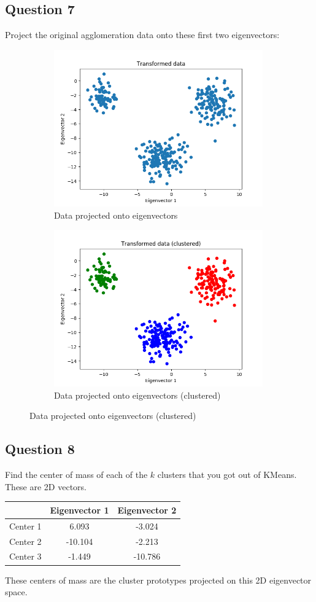 \documentclass{math}
\begin{document}
\subsection*{Question 7}
Project the original agglomeration data onto these first two eigenvectors:
\begin{figure}[H]
  \begin{subfigure}{0.5\linewidth}
    \centering
    \includegraphics[width=9cm]{assets/hw_07_projected_data.png}
    \caption{Data projected onto eigenvectors}
  \end{subfigure}
  \begin{subfigure}{0.5\linewidth}
    \centering
    \includegraphics[width=9cm]{assets/hw_07_projected_data_clustered.png}
    \caption{Data projected onto eigenvectors (clustered)}
  \end{subfigure}
\end{figure}

\subsection*{Question 8}
Find the center of mass of each of the \( k \) clusters that you got out of
KMeans. These are 2D vectors.
\begin{center}
  \begin{tabular}{|c|c|c|}
    \hline
    & Eigenvector 1 & Eigenvector 2 \\
    \hline
    Center 1 & 6.093 & -3.024 \\
    Center 2 & -10.104 & -2.213 \\
    Center 3 & -1.449 & -10.786 \\
    \hline
  \end{tabular}
\end{center}
These centers of mass are the cluster prototypes projected on this 2D
eigenvector space.
\end{document}
